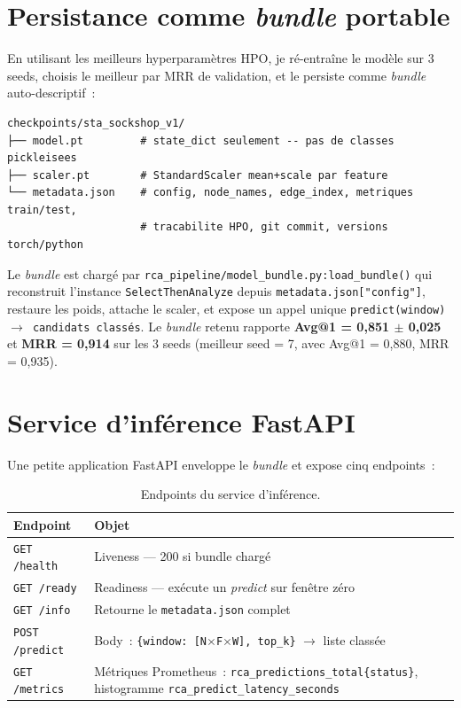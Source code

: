 \documentclass[a4paper,11pt,oneside]{report}
\begin{document}
\section{Persistance comme \emph{bundle} portable}
\label{sec:bundle}

En utilisant les meilleurs hyperparam\`etres HPO, je r\'e-entra\^ine le mod\`ele sur 3 seeds, choisis le meilleur par MRR de validation, et le persiste comme \emph{bundle} auto-descriptif~:

\begin{lstlisting}[style=shell,caption={Structure du bundle persist\'e.}]
checkpoints/sta_sockshop_v1/
├── model.pt         # state_dict seulement -- pas de classes pickleisees
├── scaler.pt        # StandardScaler mean+scale par feature
└── metadata.json    # config, node_names, edge_index, metriques train/test,
                     # tracabilite HPO, git commit, versions torch/python
\end{lstlisting}

Le \emph{bundle} est charg\'e par \texttt{rca\_pipeline/model\_bundle.py:load\_bundle()} qui reconstruit l'instance \texttt{SelectThenAnalyze} depuis \texttt{metadata.json["config"]}, restaure les poids, attache le scaler, et expose un appel unique \texttt{predict(window) $\to$ candidats class\'es}. Le \emph{bundle} retenu rapporte \textbf{Avg@1 = 0{,}851 $\pm$ 0{,}025} et \textbf{MRR = 0{,}914} sur les 3 seeds (meilleur seed = 7, avec Avg@1 = 0{,}880, MRR = 0{,}935).

\section{Service d'inf\'erence FastAPI}
\label{sec:serve}

Une petite application FastAPI enveloppe le \emph{bundle} et expose cinq endpoints~:

\begin{table}[ht]
\centering
\caption{Endpoints du service d'inf\'erence.}
\label{tab:endpoints}
\begin{tabular}{ll}
\toprule
Endpoint & Objet \\
\midrule
\texttt{GET /health} & Liveness --- 200 si bundle charg\'e \\
\texttt{GET /ready} & Readiness --- ex\'ecute un \emph{predict} sur fen\^etre z\'ero \\
\texttt{GET /info} & Retourne le \texttt{metadata.json} complet \\
\texttt{POST /predict} & Body~: \texttt{\{window: [N$\times$F$\times$W], top\_k\}} $\to$ liste class\'ee \\
\texttt{GET /metrics} & M\'etriques Prometheus~: \texttt{rca\_predictions\_total\{status\}}, histogramme \texttt{rca\_predict\_latency\_seconds} \\
\bottomrule
\end{tabular}
\end{table}
\end{document}
